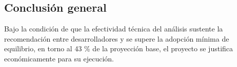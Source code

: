 \subsection{Conclusión general}\label{sec:n5.8.4}

Bajo la condición de que la efectividad técnica del análisis sustente la recomendación entre desarrolladores y se supere la adopción mínima de equilibrio, en torno al 43 \% de la proyección base, el proyecto se justifica económicamente para su ejecución.
